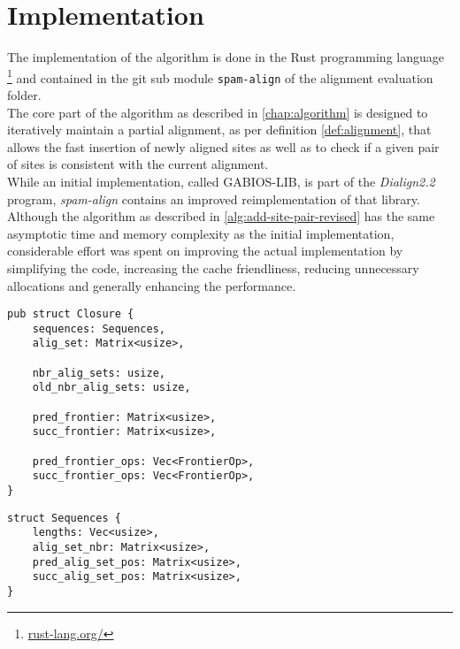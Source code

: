 \chapter{Implementation}
The implementation of the algorithm is done in the Rust programming language \footnote{\href{rust-lang.org/}{rust-lang.org/}} and contained in the git sub module \texttt{spam-align} of the alignment evaluation folder.\\
The core part of the algorithm as described in \ref{chap:algorithm} is designed to iteratively maintain a partial alignment, as per definition \ref{def:alignment}, that allows the fast insertion of newly aligned sites as well as to check if a given pair of sites is consistent with the current alignment.\\
While an initial implementation, called GABIOS-LIB, is part of the \textit{Dialign2.2} program, \textit{spam-align} contains an improved reimplementation of that library.\\
Although the algorithm as described in \ref{alg:add-site-pair-revised} has the same asymptotic time and memory complexity as the initial implementation, considerable effort was spent on improving the actual implementation by simplifying the code, increasing the cache friendliness, reducing unnecessary allocations and generally enhancing the performance.
\begin{multicols}{2}
\begin{verbatim}
pub struct Closure {
	sequences: Sequences,
	alig_set: Matrix<usize>,
	
	nbr_alig_sets: usize,
	old_nbr_alig_sets: usize,
	
	pred_frontier: Matrix<usize>,
	succ_frontier: Matrix<usize>,
	
	pred_frontier_ops: Vec<FrontierOp>,
	succ_frontier_ops: Vec<FrontierOp>,
}
\end{verbatim}

\begin{verbatim}
struct Sequences {
	lengths: Vec<usize>,
	alig_set_nbr: Matrix<usize>,
	pred_alig_set_pos: Matrix<usize>,
	succ_alig_set_pos: Matrix<usize>,
}
\end{verbatim}
\label{lst:core-types}
\end{multicols}

